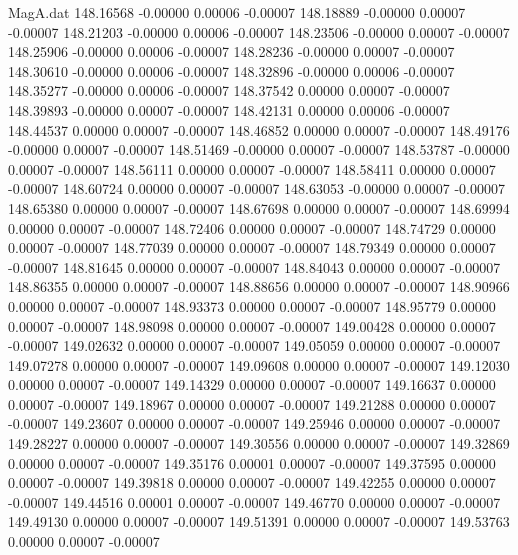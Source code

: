 \begin{filecontents}{MagA.dat}
 148.16568   -0.00000    0.00006   -0.00007
 148.18889   -0.00000    0.00007   -0.00007
 148.21203   -0.00000    0.00006   -0.00007
 148.23506   -0.00000    0.00007   -0.00007
 148.25906   -0.00000    0.00006   -0.00007
 148.28236   -0.00000    0.00007   -0.00007
 148.30610   -0.00000    0.00006   -0.00007
 148.32896   -0.00000    0.00006   -0.00007
 148.35277   -0.00000    0.00006   -0.00007
 148.37542    0.00000    0.00007   -0.00007
 148.39893   -0.00000    0.00007   -0.00007
 148.42131    0.00000    0.00006   -0.00007
 148.44537    0.00000    0.00007   -0.00007
 148.46852    0.00000    0.00007   -0.00007
 148.49176   -0.00000    0.00007   -0.00007
 148.51469   -0.00000    0.00007   -0.00007
 148.53787   -0.00000    0.00007   -0.00007
 148.56111    0.00000    0.00007   -0.00007
 148.58411    0.00000    0.00007   -0.00007
 148.60724    0.00000    0.00007   -0.00007
 148.63053   -0.00000    0.00007   -0.00007
 148.65380    0.00000    0.00007   -0.00007
 148.67698    0.00000    0.00007   -0.00007
 148.69994    0.00000    0.00007   -0.00007
 148.72406    0.00000    0.00007   -0.00007
 148.74729    0.00000    0.00007   -0.00007
 148.77039    0.00000    0.00007   -0.00007
 148.79349    0.00000    0.00007   -0.00007
 148.81645    0.00000    0.00007   -0.00007
 148.84043    0.00000    0.00007   -0.00007
 148.86355    0.00000    0.00007   -0.00007
 148.88656    0.00000    0.00007   -0.00007
 148.90966    0.00000    0.00007   -0.00007
 148.93373    0.00000    0.00007   -0.00007
 148.95779    0.00000    0.00007   -0.00007
 148.98098    0.00000    0.00007   -0.00007
 149.00428    0.00000    0.00007   -0.00007
 149.02632    0.00000    0.00007   -0.00007
 149.05059    0.00000    0.00007   -0.00007
 149.07278    0.00000    0.00007   -0.00007
 149.09608    0.00000    0.00007   -0.00007
 149.12030    0.00000    0.00007   -0.00007
 149.14329    0.00000    0.00007   -0.00007
 149.16637    0.00000    0.00007   -0.00007
 149.18967    0.00000    0.00007   -0.00007
 149.21288    0.00000    0.00007   -0.00007
 149.23607    0.00000    0.00007   -0.00007
 149.25946    0.00000    0.00007   -0.00007
 149.28227    0.00000    0.00007   -0.00007
 149.30556    0.00000    0.00007   -0.00007
 149.32869    0.00000    0.00007   -0.00007
 149.35176    0.00001    0.00007   -0.00007
 149.37595    0.00000    0.00007   -0.00007
 149.39818    0.00000    0.00007   -0.00007
 149.42255    0.00000    0.00007   -0.00007
 149.44516    0.00001    0.00007   -0.00007
 149.46770    0.00000    0.00007   -0.00007
 149.49130    0.00000    0.00007   -0.00007
 149.51391    0.00000    0.00007   -0.00007
 149.53763    0.00000    0.00007   -0.00007

\end{filecontents}
